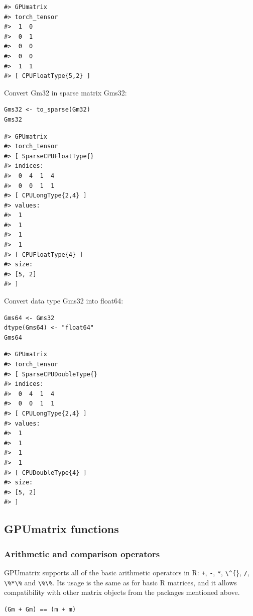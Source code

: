 \begin{verbatim}
#> GPUmatrix
#> torch_tensor
#>  1  0
#>  0  1
#>  0  0
#>  0  0
#>  1  1
#> [ CPUFloatType{5,2} ]
\end{verbatim}

Convert Gm32 in sparse matrix Gms32:

\begin{verbatim}
Gms32 <- to_sparse(Gm32)
Gms32
\end{verbatim}

\begin{verbatim}
#> GPUmatrix
#> torch_tensor
#> [ SparseCPUFloatType{}
#> indices:
#>  0  4  1  4
#>  0  0  1  1
#> [ CPULongType{2,4} ]
#> values:
#>  1
#>  1
#>  1
#>  1
#> [ CPUFloatType{4} ]
#> size:
#> [5, 2]
#> ]
\end{verbatim}

Convert data type Gms32 into float64:

\begin{verbatim}
Gms64 <- Gms32
dtype(Gms64) <- "float64"
Gms64
\end{verbatim}

\begin{verbatim}
#> GPUmatrix
#> torch_tensor
#> [ SparseCPUDoubleType{}
#> indices:
#>  0  4  1  4
#>  0  0  1  1
#> [ CPULongType{2,4} ]
#> values:
#>  1
#>  1
#>  1
#>  1
#> [ CPUDoubleType{4} ]
#> size:
#> [5, 2]
#> ]
\end{verbatim}

\hypertarget{gpumatrix-functions}{%
\subsection{GPUmatrix functions}\label{gpumatrix-functions}}

\hypertarget{arithmetic-and-comparison-operators}{%
\subsubsection{Arithmetic and comparison operators}\label{arithmetic-and-comparison-operators}}

GPUmatrix supports all of the basic arithmetic operators in R: \texttt{+}, \texttt{-}, \texttt{*}, \texttt{\textbackslash{}\^{}\{}\}, \texttt{/}, \texttt{\textbackslash{}\%*\textbackslash{}\%} and \texttt{\textbackslash{}\%\textbackslash{}\%}. Its usage is the same as for basic R matrices, and it allows compatibility with other matrix objects from the packages mentioned above.

\begin{verbatim}
(Gm + Gm) == (m + m)
\end{verbatim}

